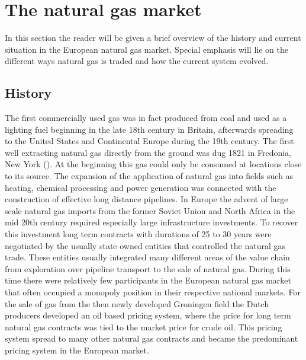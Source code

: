 \chapter{The natural gas market}
In this section the reader will be given a brief overview of the history and current situation in the European natural gas market. Special emphasis will lie on the different ways natural gas is traded and how the current system  evolved. 

\section{History}
The first commercially used gas was in fact produced from coal and used as a lighting fuel beginning in the late 18th century in Britain, afterwards spreading to the United States and Continental Europe during the 19th century. The first well extracting natural gas directly from the ground was dug 1821 in Fredonia, New York (\cite{heather_evolution_2015}). At the beginning this gas could only be consumed at locations close to its source. The expansion of the application of natural gas into fields such as heating, chemical processing and power generation was connected with the construction of effective long distance pipelines. In Europe the advent of large scale natural gas imports from the former Soviet Union and North Africa in the mid 20th century required especially large infrastructure investments. To recover this investment long term contracts with durations of 25 to 30 years were negotiated by the usually state owned entities that controlled the natural gas trade. These entities usually integrated many different areas of the value chain from exploration over pipeline transport to the sale of natural gas. During this time there were relatively few participants in the European natural gas market that often occupied a monopoly position in their respective national markets.
For the sale of gas from the then newly developed Groningen field the Dutch producers developed an oil based pricing system, where the price for long term natural gas contracts was tied to the market price for crude oil. This pricing system spread to many other natural gas contracts and became the predominant pricing system in the European market.

